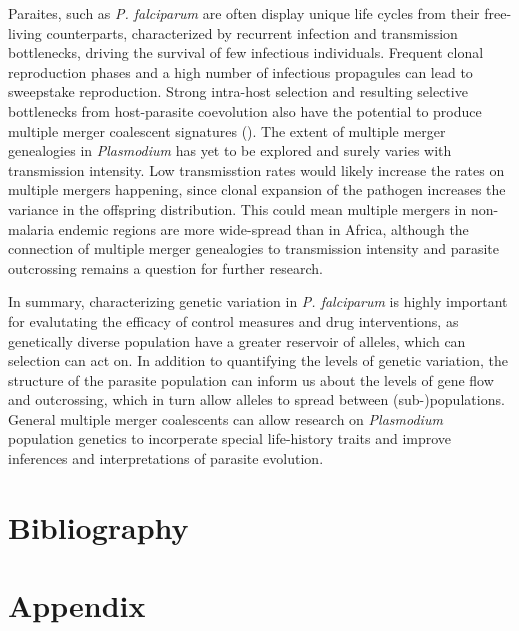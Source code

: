\documentclass[11pt]{article}
\begin{document}
Paraites, such as \emph{P. falciparum} are often display unique life cycles from their free-living counterparts, characterized by recurrent infection and transmission bottlenecks, driving the survival of few infectious individuals. Frequent clonal reproduction phases and a high number of infectious propagules can lead to sweepstake reproduction. Strong intra-host selection and resulting selective bottlenecks from host-parasite coevolution also have the potential to produce multiple merger coalescent signatures (\cite{tellier-2014-coales}).
The extent of multiple merger genealogies in \emph{Plasmodium} has yet to be explored and surely varies with transmission intensity. Low transmisstion rates would likely increase the rates on multiple mergers happening, since clonal expansion of the pathogen increases the variance in the offspring distribution. This could mean multiple mergers in non-malaria endemic regions are more wide-spread than in Africa, although the connection of multiple merger genealogies to transmission intensity and parasite outcrossing remains a question for further research.

In summary, characterizing genetic variation in \emph{P. falciparum} is highly important for evalutating the efficacy of control measures and drug interventions, as genetically diverse population have a greater reservoir of alleles, which can selection can act on. In addition to quantifying the levels of genetic variation, the structure of the parasite population can inform us about the levels of gene flow and outcrossing, which in turn allow alleles to spread between (sub-)populations. General multiple merger coalescents can allow research on \emph{Plasmodium} population genetics to incorperate special life-history traits and improve inferences and interpretations of parasite evolution.
\newpage
\section*{Bibliography}
\label{sec:orgca09fa1}
\printbibliography

\newpage
\section*{Appendix}
\label{sec:org24343d4}
\appendix
\end{document}
